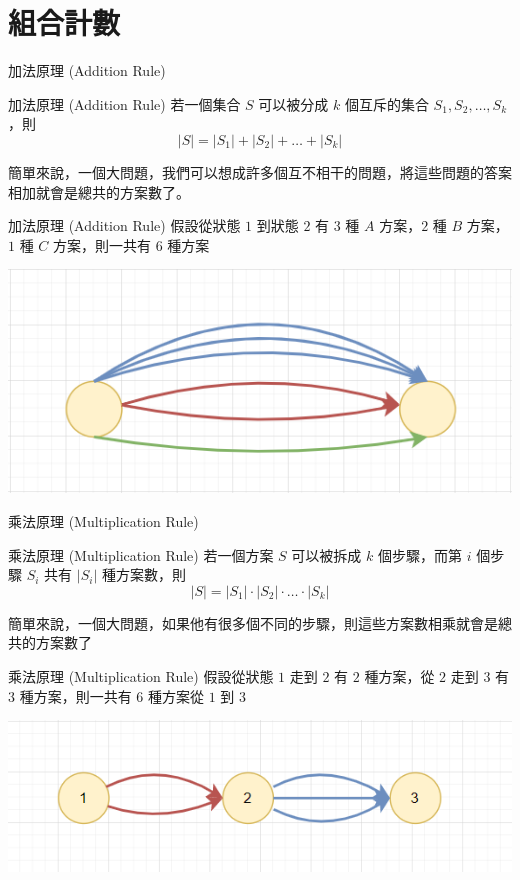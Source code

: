 \documentclass[aspectratio=169]{beamer}
\begin{document}
\section{組合計數}

\begin{frame}{加法原理 (Addition Rule)}
    \begin{alertblock}{加法原理 (Addition Rule)}
        若一個集合 $S$ 可以被分成 $k$ 個互斥的集合 $S_1, S_2, \dots, S_k$，則 $$|S| = |S_1|+|S_2|+\dots+|S_k|$$
    \end{alertblock} \pause
    簡單來說，一個大問題，我們可以想成許多個互不相干的問題，將這些問題的答案相加就會是總共的方案數了。
\end{frame}

\begin{frame}{加法原理 (Addition Rule)}
    假設從狀態 $1$ 到狀態 $2$ 有 $3$ 種 $A$ 方案，$2$ 種 $B$ 方案，$1$ 種 $C$ 方案，則一共有 $6$ 種方案
    \begin{center}
        \includegraphics[scale=0.75]{images/addition.png}
    \end{center}
\end{frame}

\begin{frame}{乘法原理 (Multiplication Rule)}
    \begin{alertblock}{乘法原理 (Multiplication Rule)}
        若一個方案 $S$ 可以被拆成 $k$ 個步驟，而第 $i$ 個步驟 $S_i$ 共有 $|S_i|$ 種方案數，則
        $$|S| = |S_1| \cdot |S_2| \cdot \dots \cdot |S_k|$$
    \end{alertblock} \pause
    簡單來說，一個大問題，如果他有很多個不同的步驟，則這些方案數相乘就會是總共的方案數了
\end{frame}

\begin{frame}{乘法原理 (Multiplication Rule)}
    假設從狀態 $1$ 走到 $2$ 有 $2$ 種方案，從 $2$ 走到 $3$ 有 $3$ 種方案，則一共有 $6$ 種方案從 $1$ 到 $3$
    \begin{center}
        \includegraphics[scale=0.75]{images/multiplication.png}
    \end{center}
\end{frame}
\end{document}
